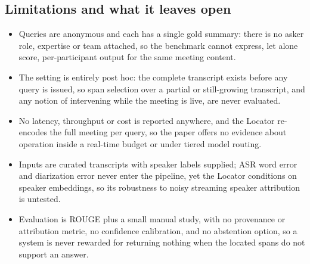 \subsection{Limitations and what it leaves open}
\begin{itemize}[leftmargin=1.2em, itemsep=1pt, topsep=2pt]
  \item Queries are anonymous and each has a single gold summary: there is no asker role, expertise or team attached, so the benchmark cannot express, let alone score, per-participant output for the same meeting content.
  \item The setting is entirely post hoc: the complete transcript exists before any query is issued, so span selection over a partial or still-growing transcript, and any notion of intervening while the meeting is live, are never evaluated.
  \item No latency, throughput or cost is reported anywhere, and the Locator re-encodes the full meeting per query, so the paper offers no evidence about operation inside a real-time budget or under tiered model routing.
  \item Inputs are curated transcripts with speaker labels supplied; ASR word error and diarization error never enter the pipeline, yet the Locator conditions on speaker embeddings, so its robustness to noisy streaming speaker attribution is untested.
  \item Evaluation is ROUGE plus a small manual study, with no provenance or attribution metric, no confidence calibration, and no abstention option, so a system is never rewarded for returning nothing when the located spans do not support an answer.
\end{itemize}

